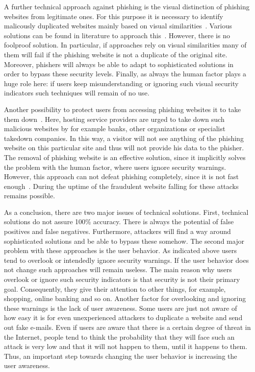 \begin{description}[leftmargin=0cm]
	\item[Visual distinction] A further technical approach against phishing is the visual distinction of phishing websites from legitimate ones. For this purpose it is necessary to identify malicously duplicated websites mainly based on visual similarities~\cite{liu2006antiphishing}. Various solutions can be found in literature to approach this~\cite{chen2009fighting,chen2010detecting,zhang2011textual}. However, there is no foolproof solution. In particular, if approaches rely on visual similarities many of them will fail if the phishing website is not a duplicate of the original site. Moreover, phishers will always be able to adapt to sophisticated solutions in order to bypass these security levels. Finally, as always the human factor plays a huge role here: if users keep misunderstanding or ignoring such visual security indicators such techniques will remain of no use.
	\item[Takedown] Another possibility to protect users from accessing phishing websites it to take them down~\cite{moore2007examining}. Here, hosting service providers are urged to take down such malicious websites by for example banks, other organizations or specialist takedown companies. In this way, a visitor will not see anything of the phishing website on this particular site and thus will not provide his data to the phisher. The removal of phishing website is an effective solution, since it implicitly solves the problem with the human factor, where users ignore security warnings. However, this approach can not defeat phishing completely, since it is not fast enough~\cite{moore2007examining}. During the uptime of the fraudulent website falling for these attacks remains possible.
\end{description}

As a conclusion, there are two major issues of technical solutions. First, technical solutions do not assure 100\% accuracy. There is always the potential of false positives and false negatives. Furthermore, attackers will find a way around sophisticated solutions and be able to bypass these somehow. The second major problem with these approaches is the user behavior. As indicated above users tend to overlook or intendedly ignore security warnings. If the user behavior does not change such approaches will remain useless. The main reason why users overlook or ignore such security indicators is that security is not their primary goal. Consequently, they give their attention to other things, for example, shopping, online banking and so on. Another factor for overlooking and ignoring these warnings is the lack of user awareness. Some users are just not aware of how easy it is for even unexperienced attackers to duplicate a website and send out fake e-mails. Even if users are aware that there is a certain degree of threat in the Internet, people tend to think the probability that they will face such an attack is very low and that it will not happen to them, until it happens to them. Thus, an important step towards changing the user behavior is increasing the user awareness.


